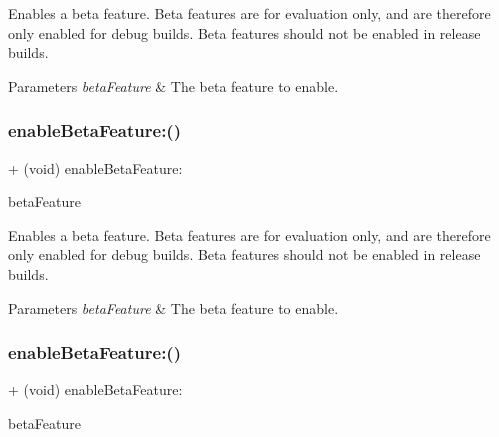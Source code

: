 Enables a beta feature. Beta features are for evaluation only, and are therefore only enabled for debug builds. Beta features should not be enabled in release builds.


\begin{DoxyParams}{Parameters}
{\em beta\+Feature} & The beta feature to enable. \\
\hline
\end{DoxyParams}
\mbox{\label{interfaceFBSettings_a390b436e1de87f3d49979a6aa98e14b1}} 
\subsubsection{\texorpdfstring{enable\+Beta\+Feature\+:()}{enableBetaFeature:()}\hspace{0.1cm}{\footnotesize\ttfamily [4/5]}}
{\footnotesize\ttfamily + (void) enable\+Beta\+Feature\+: \begin{DoxyParamCaption}\item[{(F\+B\+Beta\+Features)}]{beta\+Feature }\end{DoxyParamCaption}}

Enables a beta feature. Beta features are for evaluation only, and are therefore only enabled for debug builds. Beta features should not be enabled in release builds.


\begin{DoxyParams}{Parameters}
{\em beta\+Feature} & The beta feature to enable. \\
\hline
\end{DoxyParams}
\mbox{\label{interfaceFBSettings_a390b436e1de87f3d49979a6aa98e14b1}} 
\subsubsection{\texorpdfstring{enable\+Beta\+Feature\+:()}{enableBetaFeature:()}\hspace{0.1cm}{\footnotesize\ttfamily [5/5]}}
{\footnotesize\ttfamily + (void) enable\+Beta\+Feature\+: \begin{DoxyParamCaption}\item[{(F\+B\+Beta\+Features)}]{beta\+Feature }\end{DoxyParamCaption}}

